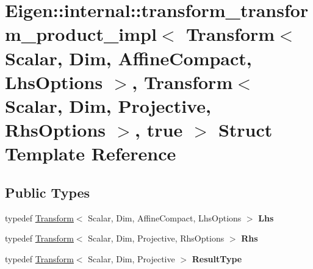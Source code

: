 \hypertarget{struct_eigen_1_1internal_1_1transform__transform__product__impl_3_01_transform_3_01_scalar_00_013384ded452302af9ec99c76aff6d09ab}{}\section{Eigen\+::internal\+::transform\+\_\+transform\+\_\+product\+\_\+impl$<$ Transform$<$ Scalar, Dim, Affine\+Compact, Lhs\+Options $>$, Transform$<$ Scalar, Dim, Projective, Rhs\+Options $>$, true $>$ Struct Template Reference}
\label{struct_eigen_1_1internal_1_1transform__transform__product__impl_3_01_transform_3_01_scalar_00_013384ded452302af9ec99c76aff6d09ab}
\subsection*{Public Types}
\begin{DoxyCompactItemize}
\item 
\mbox{\label{struct_eigen_1_1internal_1_1transform__transform__product__impl_3_01_transform_3_01_scalar_00_013384ded452302af9ec99c76aff6d09ab_ac4a444e8aa52cafb60e0aea0aa3a3f6a}} 
typedef \mbox{\hyperlink{class_eigen_1_1_transform}{Transform}}$<$ Scalar, Dim, Affine\+Compact, Lhs\+Options $>$ {\bfseries Lhs}
\item 
\mbox{\label{struct_eigen_1_1internal_1_1transform__transform__product__impl_3_01_transform_3_01_scalar_00_013384ded452302af9ec99c76aff6d09ab_a1438a0f5317ffedb35efb80b554df610}} 
typedef \mbox{\hyperlink{class_eigen_1_1_transform}{Transform}}$<$ Scalar, Dim, Projective, Rhs\+Options $>$ {\bfseries Rhs}
\item 
\mbox{\label{struct_eigen_1_1internal_1_1transform__transform__product__impl_3_01_transform_3_01_scalar_00_013384ded452302af9ec99c76aff6d09ab_ac6d182db1ca69e425a02078966f99ca6}} 
typedef \mbox{\hyperlink{class_eigen_1_1_transform}{Transform}}$<$ Scalar, Dim, Projective $>$ {\bfseries Result\+Type}
\end{DoxyCompactItemize}
